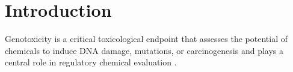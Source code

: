\section{Introduction}\label{sec:intro}

Genotoxicity is a critical toxicological endpoint that assesses the potential of chemicals to induce DNA damage, 
mutations, or carcinogenesis and plays a central role in regulatory chemical evaluation \citep{Karamertzanis2025, Hayashi2022, EFSA2018}.




